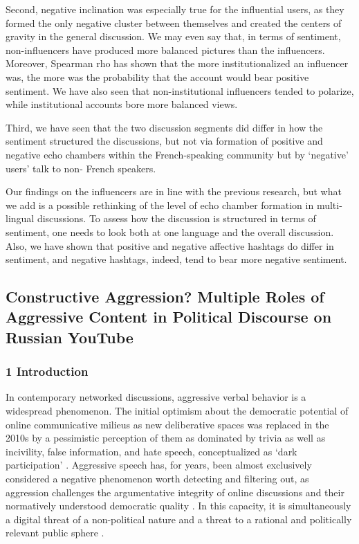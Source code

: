 Second, negative inclination was especially true for the influential users, as they formed the only negative cluster between themselves and created the centers of gravity in the general discussion. We may even say that, in terms of sentiment, non-influencers have produced more balanced pictures than the influencers. Moreover, Spearman rho has shown that the more institutionalized an influencer was, the more was the probability that the account would bear positive sentiment. We have also seen that non-institutional influencers tended to polarize, while institutional accounts bore more balanced views.

Third, we have seen that the two discussion segments did differ in how the sentiment structured the discussions, but not via formation of positive and negative echo chambers within the French-speaking community but by ‘negative’ users’ talk to non-
French speakers.

Our findings on the influencers are in line with the previous research, but what we add is a possible rethinking of the level of echo chamber formation in multi-lingual discussions. To assess how the discussion is structured in terms of sentiment, one needs to look both at one language and the overall discussion. Also, we have shown that positive and negative affective hashtags do differ in sentiment, and negative hashtags, indeed, tend to bear more negative sentiment.

\subsection{Constructive Aggression? Multiple Roles of Aggressive Content in Political Discourse on Russian YouTube}\label{subsec:ch5/sec3/sub5}

\subsubsection{1 Introduction}

In contemporary networked discussions, aggressive verbal behavior is a widespread phenomenon. The initial optimism about the democratic potential of online communicative milieus as new deliberative spaces \cite{DiakopoulosNaaman} was replaced in the 2010s by a pessimistic perception of them as dominated by trivia \cite{Fuchs} as well as incivility, false information, and hate speech, conceptualized as ‘dark participation’ \cite{Quandt}. Aggressive speech has, for years, been almost exclusively considered a negative phenomenon worth detecting and filtering out, as aggression challenges the argumentative integrity of online discussions \cite{VollhardtCoutinStaub} and their normatively understood democratic quality \cite{Cortese}. In this capacity, it is simultaneously a digital threat of a non-political nature \cite{SalterKuehnBerentsonShaw} and a threat to a rational and politically relevant public sphere \cite{MillerVaccari,Pfetsch}.

